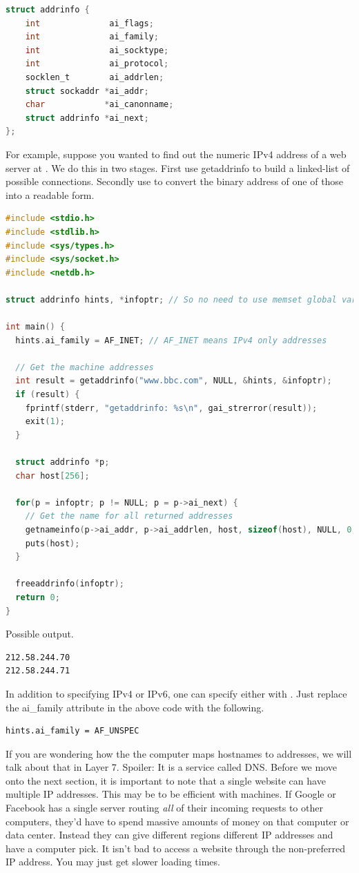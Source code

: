 \begin{lstlisting}[language=C]
struct addrinfo {
    int              ai_flags;
    int              ai_family;
    int              ai_socktype;
    int              ai_protocol;
    socklen_t        ai_addrlen;
    struct sockaddr *ai_addr;
    char            *ai_canonname;
    struct addrinfo *ai_next;
};
\end{lstlisting}

For example, suppose you wanted to find out the numeric IPv4 address of a web server at .
We do this in two stages.
First use getaddrinfo to build a linked-list of possible connections.
Secondly use  to convert the binary address of one of those into a readable form.

\begin{lstlisting}[language=C]
#include <stdio.h>
#include <stdlib.h>
#include <sys/types.h>
#include <sys/socket.h>
#include <netdb.h>

struct addrinfo hints, *infoptr; // So no need to use memset global variables

int main() {
  hints.ai_family = AF_INET; // AF_INET means IPv4 only addresses

  // Get the machine addresses
  int result = getaddrinfo("www.bbc.com", NULL, &hints, &infoptr);
  if (result) {
    fprintf(stderr, "getaddrinfo: %s\n", gai_strerror(result));
    exit(1);
  }

  struct addrinfo *p;
  char host[256];

  for(p = infoptr; p != NULL; p = p->ai_next) {
    // Get the name for all returned addresses
    getnameinfo(p->ai_addr, p->ai_addrlen, host, sizeof(host), NULL, 0, NI_NUMERICHOST);
    puts(host);
  }

  freeaddrinfo(infoptr);
  return 0;
}
\end{lstlisting}

Possible output.

\begin{lstlisting}
212.58.244.70
212.58.244.71
\end{lstlisting}

In addition to specifying IPv4 or IPv6, one can specify either with .
Just replace the ai\_family attribute in the above code with the following.

\begin{lstlisting}
hints.ai_family = AF_UNSPEC
\end{lstlisting}

If you are wondering how the the computer maps \gls{hostnames} to addresses, we will talk about that in Layer 7.
Spoiler: It is a service called \gls{DNS}.
Before we move onto the next section, it is important to note that a single website can have multiple IP addresses.
This may be to be efficient with machines.
If Google or Facebook has a single server routing \textit{all} of their incoming requests to other computers, they'd have to spend massive amounts of money on that computer or data center.
Instead they can give different regions different IP addresses and have a computer pick.
It isn't bad to access a website through the non-preferred IP address.
You may just get slower loading times.

